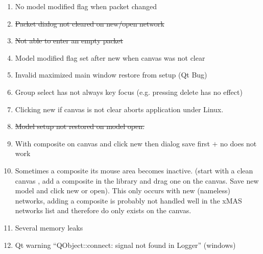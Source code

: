 \begin{enumerate} \label{sec:bug-list}
\item	No model modified flag when packet changed
\item	\st{Packet dialog not cleared on new/open network}
\item \st{Not able to enter an empty packet}
\item	Model modified flag set after new when canvas was not clear
\item	Invalid maximized main window restore from setup (Qt Bug)
\item	Group select has not always key focus (e.g. pressing delete has no effect)
\item	Clicking new if canvas is not clear aborts application under Linux.
\item	\st{Model setup not restored on model open.}
\item With composite on canvas and click new then dialog save first $+$ no does not
work
\item Sometimes a composite its mouse area becomes inactive. (start with a clean
canvas , add a composite in the library and drag one on the canvas. Save new
model and click new or open). This only occurs with new (nameless) networks,
adding a composite is probably not handled well in the xMAS networks list and
therefore do only exists on the canvas.
\item	Several memory leaks
\item Qt warning ``QObject::connect: signal not found in Logger'' (windows)
\end{enumerate}
